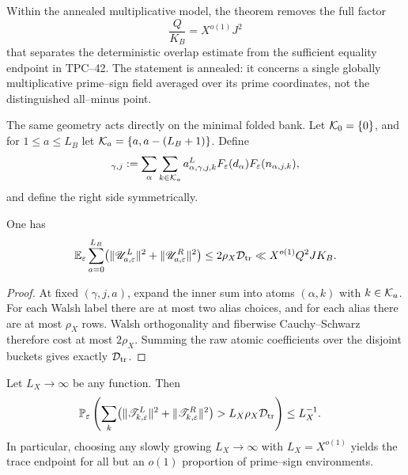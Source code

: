 Within the annealed multiplicative model, the theorem removes the full
factor
\begin{equation}
 \frac{Q}{K_B}=X^{o(1)}J^2
 \label{eq:tpc43-annealed-closes-J2}
\end{equation}
that separates the deterministic overlap estimate from the sufficient
equality endpoint in TPC--42.  The statement is annealed: it concerns a
single globally multiplicative prime--sign field averaged over its prime
coordinates, not the distinguished all--minus point.

The same geometry acts directly on the minimal folded bank.  Let
\(\mathcal K_0=\{0\}\), and for \(1\le a\le L_B\) let
\(\mathcal K_a=\{a,a-(L_B+1)\}\).  Define
\begin{equation}
 [\mathscr U_{a,\varepsilon}^L]_{\gamma,j}
 :=\sum_\alpha\sum_{k\in\cK_a}
 a^L_{\alpha,\gamma,j,k}
 F_\varepsilon(d_\alpha)F_\varepsilon(n_{\alpha,j,k}),
 \label{eq:tpc43-random-folded-column}
\end{equation}
and define the right side symmetrically.

\begin{corollary}
\label{cor:tpc43-annealed-folded}
One has
\begin{equation}
 \mathbb E_\varepsilon\sum_{a=0}^{L_B}
 \bigl(
  \|\mathscr U_{a,\varepsilon}^L\|^2
  +\|\mathscr U_{a,\varepsilon}^R\|^2
 \bigr)
 \le2\rho_X\mathcal D_{\rm tr}
 \ll X^{o(1)}Q^2JK_B.
 \label{eq:tpc43-annealed-folded-bound}
\end{equation}
\end{corollary}

\begin{proof}
At fixed \((\gamma,j,a)\), expand the inner sum into atoms
\((\alpha,k)\) with \(k\in\mathcal K_a\).  For each Walsh label there are at
most two alias choices, and for each alias there are at most \(\rho_X\)
rows.  Walsh orthogonality and fiberwise Cauchy--Schwarz therefore cost
at most \(2\rho_X\).  Summing the raw atomic coefficients over the
disjoint buckets gives exactly \(\mathcal D_{\rm tr}\).
\end{proof}

\begin{corollary}
\label{cor:tpc43-one-scale-trace}
Let \(L_X\to\infty\) be any function.  Then
\begin{align}
 &\mathbb P_\varepsilon\left(
 \sum_k
 \bigl(
 \|\mathscr T_{k,\varepsilon}^L\|^2
 +\|\mathscr T_{k,\varepsilon}^R\|^2
 \bigr)
 >L_X\rho_X\mathcal D_{\rm tr}
 \right)
 \le L_X^{-1}.
 \label{eq:tpc43-trace-Markov}
\end{align}
In particular, choosing any slowly growing \(L_X\to\infty\) with
\(L_X=X^{o(1)}\) yields the trace endpoint for all but an \(o(1)\)
proportion of prime--sign environments.
\end{corollary}

